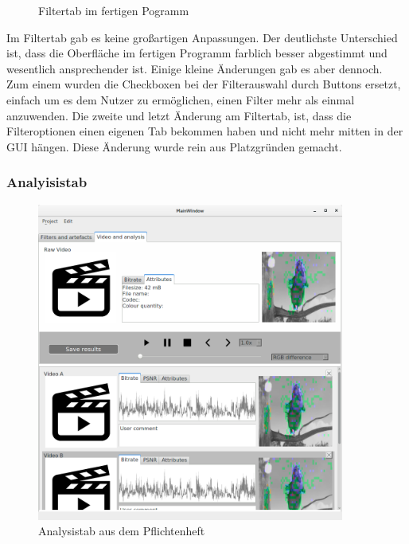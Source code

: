 \documentclass{scrartcl}
\begin{document}
{\begin{figure}[ht]
\caption{Filtertab im fertigen Pogramm}
\end{figure}
Im Filtertab gab es keine großartigen Anpassungen. Der deutlichste Unterschied ist, dass die Oberfläche im fertigen Programm farblich besser abgestimmt und wesentlich ansprechender ist. Einige kleine Änderungen gab es aber dennoch. Zum einem wurden die Checkboxen bei der Filterauswahl durch Buttons ersetzt, einfach um es dem Nutzer zu ermöglichen, einen Filter mehr als einmal anzuwenden. Die zweite und letzt Änderung am Filtertab, ist, dass die Filteroptionen einen eigenen Tab bekommen haben und nicht mehr mitten in der GUI hängen. Diese Änderung wurde rein aus Platzgründen gemacht.
\newpage
\hfill
\newpage
\subsubsection{Analyisistab}
\bigskip
\begin{figure}[ht]
\centering
\includegraphics[width=0.9\textwidth]{Pictures/analysistabalt.png}
\caption{Analysistab aus dem Pflichtenheft}
\end{figure}
\begin{figure}[ht]
\centering

\end{figure}}
\end{document}
